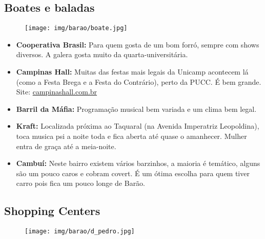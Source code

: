 \subsection{Boates e baladas}

\begin{figure}[h!]
  \centering
  \texttt{[image: img/barao/boate.jpg]}
\end{figure}

\begin{itemize}
\item \textbf{Cooperativa Brasil:} Para quem gosta de um bom forró, sempre com
  shows diversos. A galera gosta muito da quarta-universitária.

\item \textbf{Campinas Hall:} Muitas das festas mais legais da Unicamp
  acontecem lá (como a Festa Brega e a Festa do Contrário), perto da PUCC. É
  bem grande.
  \\Site: \url{campinashall.com.br}

\item \textbf{Barril da Máfia:} Programação musical bem variada e um clima bem
  legal.

\item \textbf{Kraft:} Localizada próxima ao Taquaral (na Avenida Imperatriz
  Leopoldina), toca musica psi a noite toda e fica aberta até quase o
  amanhecer. Mulher entra de graça até a meia-noite.

\item \textbf{Cambuí:} Neste bairro existem vários barzinhos, a maioria é
  temático, alguns são um pouco caros e cobram covert. É um ótima escolha para
  quem tiver carro pois fica um pouco longe de Barão.
\end{itemize}

\subsection{Shopping Centers}

\begin{figure}[h!]
  \centering
  \texttt{[image: img/barao/d\_pedro.jpg]}
\end{figure}

